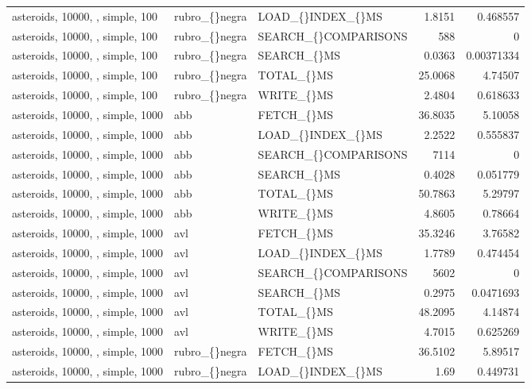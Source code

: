 \begin{longtable}{p{4cm}p{1.4cm}p{2.6cm}rr}
asteroids, 10000, , simple, 100 & rubro\_\allowbreak\{\}negra & LOAD\_\allowbreak\{\}INDEX\_\allowbreak\{\}MS & 1.8151 & 0.468557\\
asteroids, 10000, , simple, 100 & rubro\_\allowbreak\{\}negra & SEARCH\_\allowbreak\{\}COMPARISONS & 588 & 0\\
asteroids, 10000, , simple, 100 & rubro\_\allowbreak\{\}negra & SEARCH\_\allowbreak\{\}MS & 0.0363 & 0.00371334\\
asteroids, 10000, , simple, 100 & rubro\_\allowbreak\{\}negra & TOTAL\_\allowbreak\{\}MS & 25.0068 & 4.74507\\
asteroids, 10000, , simple, 100 & rubro\_\allowbreak\{\}negra & WRITE\_\allowbreak\{\}MS & 2.4804 & 0.618633\\
asteroids, 10000, , simple, 1000 & abb & FETCH\_\allowbreak\{\}MS & 36.8035 & 5.10058\\
asteroids, 10000, , simple, 1000 & abb & LOAD\_\allowbreak\{\}INDEX\_\allowbreak\{\}MS & 2.2522 & 0.555837\\
asteroids, 10000, , simple, 1000 & abb & SEARCH\_\allowbreak\{\}COMPARISONS & 7114 & 0\\
asteroids, 10000, , simple, 1000 & abb & SEARCH\_\allowbreak\{\}MS & 0.4028 & 0.051779\\
asteroids, 10000, , simple, 1000 & abb & TOTAL\_\allowbreak\{\}MS & 50.7863 & 5.29797\\
asteroids, 10000, , simple, 1000 & abb & WRITE\_\allowbreak\{\}MS & 4.8605 & 0.78664\\
asteroids, 10000, , simple, 1000 & avl & FETCH\_\allowbreak\{\}MS & 35.3246 & 3.76582\\
asteroids, 10000, , simple, 1000 & avl & LOAD\_\allowbreak\{\}INDEX\_\allowbreak\{\}MS & 1.7789 & 0.474454\\
asteroids, 10000, , simple, 1000 & avl & SEARCH\_\allowbreak\{\}COMPARISONS & 5602 & 0\\
asteroids, 10000, , simple, 1000 & avl & SEARCH\_\allowbreak\{\}MS & 0.2975 & 0.0471693\\
asteroids, 10000, , simple, 1000 & avl & TOTAL\_\allowbreak\{\}MS & 48.2095 & 4.14874\\
asteroids, 10000, , simple, 1000 & avl & WRITE\_\allowbreak\{\}MS & 4.7015 & 0.625269\\
asteroids, 10000, , simple, 1000 & rubro\_\allowbreak\{\}negra & FETCH\_\allowbreak\{\}MS & 36.5102 & 5.89517\\
asteroids, 10000, , simple, 1000 & rubro\_\allowbreak\{\}negra & LOAD\_\allowbreak\{\}INDEX\_\allowbreak\{\}MS & 1.69 & 0.449731\\

\end{longtable}
